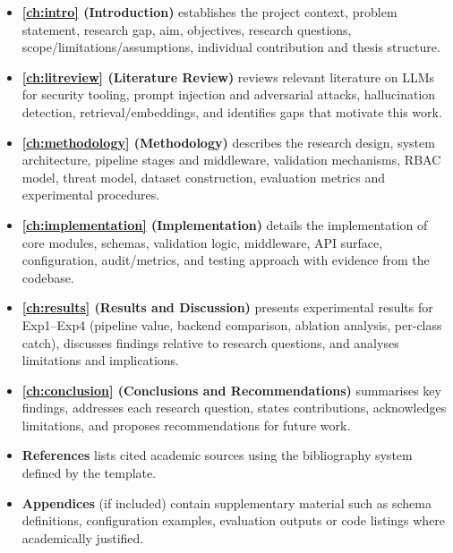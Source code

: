 \begin{itemize}
  \item \textbf{\cref{ch:intro} (Introduction)} establishes the project context, problem statement, research gap, aim, objectives, research questions, scope/limitations/assumptions, individual contribution and thesis structure.
  \item \textbf{\cref{ch:litreview} (Literature Review)} reviews relevant literature on LLMs for security tooling, prompt injection and adversarial attacks, hallucination detection, retrieval/embeddings, and identifies gaps that motivate this work.
  \item \textbf{\cref{ch:methodology} (Methodology)} describes the research design, system architecture, pipeline stages and middleware, validation mechanisms, RBAC model, threat model, dataset construction, evaluation metrics and experimental procedures.
  \item \textbf{\cref{ch:implementation} (Implementation)} details the implementation of core modules, schemas, validation logic, middleware, API surface, configuration, audit/metrics, and testing approach with evidence from the codebase.
  \item \textbf{\cref{ch:results} (Results and Discussion)} presents experimental results for Exp1--Exp4 (pipeline value, backend comparison, ablation analysis, per-class catch), discusses findings relative to research questions, and analyses limitations and implications.
  \item \textbf{\cref{ch:conclusion} (Conclusions and Recommendations)} summarises key findings, addresses each research question, states contributions, acknowledges limitations, and proposes recommendations for future work.
  \item \textbf{References} lists cited academic sources using the bibliography system defined by the template.
  \item \textbf{Appendices} (if included) contain supplementary material such as schema definitions, configuration examples, evaluation outputs or code listings where academically justified.
\end{itemize}
